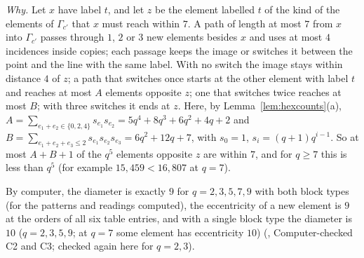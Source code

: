 \documentclass[11pt]{amsart}
\theoremstyle{definition}
\theoremstyle{remark}
\begin{document}
\emph{Why.} Let $x$ have label $t$, and let $z$ be the element labelled $t$ of the kind of the elements of $\Gamma_{c'}$ that $x$ must reach within $7$. A path of length at most $7$ from $x$ into $\Gamma_{c'}$ passes through $1$, $2$ or $3$ new elements besides $x$ and uses at most $4$ incidences inside copies; each passage keeps the image or switches it between the point and the line with the same label. With no switch the image stays within distance $4$ of $z$; a path that switches once starts at the other element with label $t$ and reaches at most $A$ elements opposite $z$; one that switches twice reaches at most $B$; with three switches it ends at $z$. Here, by Lemma~\ref{lem:hexcounts}(a), $A=\sum_{e_1+e_2\in\{0,2,4\}}s_{e_1}s_{e_2}=5q^4+8q^3+6q^2+4q+2$ and $B=\sum_{e_1+e_2+e_3\le2}s_{e_1}s_{e_2}s_{e_3}=6q^2+12q+7$, with $s_0=1$, $s_i=(q+1)q^{i-1}$. So at most $A+B+1$ of the $q^5$ elements opposite $z$ are within $7$, and for $q\ge7$ this is less than $q^5$ (for example $15{,}459<16{,}807$ at $q=7$).

By computer, the diameter is exactly $9$ for $q=2,3,5,7,9$ with both block types (for the patterns and readings computed), the eccentricity of a new element is $9$ at the orders of all six table entries, and with a single block type the diameter is $10$ ($q=2,3,5,9$; at $q=7$ some element has eccentricity $10$) (, Computer-checked C2 and C3; checked again here for $q=2,3$).
\end{document}
